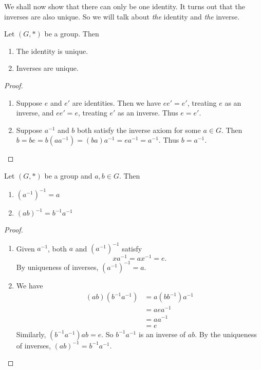 \documentclass[a4paper]{article}
\begin{document}
We shall now show that there can only be one identity. It turns out that the inverses are also unique. So we will talk about \emph{the} identity and \emph{the} inverse.
\begin{prop}
  Let $(G, *)$ be a group. Then
  \begin{enumerate}
    \item The identity is unique.
    \item Inverses are unique.
  \end{enumerate}
\end{prop}
\begin{proof}\leavevmode
  \begin{enumerate}[label=(\roman{*})]
    \item Suppose $e$ and $e'$ are identities. Then we have $ee' = e'$, treating $e$ as an inverse, and $ee' = e$, treating $e'$ as an inverse. Thus $e = e'$.
    \item Suppose $a^{-1}$ and $b$ both satisfy the inverse axiom for some $a\in G$. Then $b = be = b(aa^{-1}) = (ba)a^{-1} = ea^{-1} = a^{-1}$. Thus $b = a^{-1}$.
  \end{enumerate}
\end{proof}
\begin{prop}
  Let $(G, *)$ be a group and $a, b\in G$. Then
  \begin{enumerate}
    \item $(a^{-1})^{-1} = a$
    \item $(ab)^{-1} = b^{-1}a^{-1}$
  \end{enumerate}
\end{prop}
\begin{proof}\leavevmode
  \begin{enumerate}
    \item Given $a^{-1}$, both $a$ and $(a^{-1})^{-1}$ satisfy
      \[
        xa^{-1} = ax^{-1} = e.
      \]
      By uniqueness of inverses, $(a^{-1})^{-1} = a$.
    \item We have
      \begin{align*}
        (ab)(b^{-1}a^{-1}) &= a(bb^{-1})a^{-1} \\
        &= aea^{-1}\\
        &= aa^{-1}\\
        &= e
      \end{align*}
      Similarly, $(b^{-1}a^{-1})ab = e$. So $b^{-1}a^{-1}$ is an inverse of $ab$. By the uniqueness of inverses, $(ab)^{-1} = b^{-1}a^{-1}$.
  \end{enumerate}
\end{proof}
\end{document}
